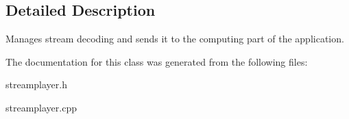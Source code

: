 \subsection{Detailed Description}
Manages stream decoding and sends it to the computing part of the application. 

The documentation for this class was generated from the following files:\begin{DoxyCompactItemize}
\item 
streamplayer.h\item 
streamplayer.cpp\end{DoxyCompactItemize}
